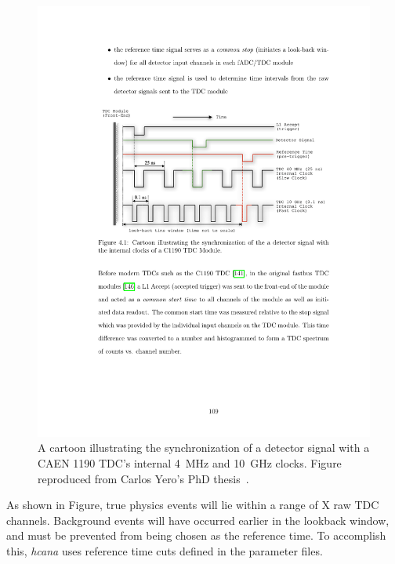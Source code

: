 \begin{figure}[!h]
    \centering
    \includegraphics[width=1.0\textwidth]{chap4/yero_reftime.pdf}
    \caption{
            A cartoon illustrating the synchronization of a detector signal
            with a CAEN 1190 TDC's internal \SI{4}{\mega\hertz} and
            \SI{10}{\giga\hertz} clocks. Figure reproduced from Carlos Yero's
            PhD thesis~\cite{Yero_2020}.
            }
    \label{fig:reference_time_cartoon}
\end{figure}


As shown in Figure,
true physics events will lie within a range of X raw TDC channels.
Background events will have occurred earlier in the lookback window, and must
be prevented from being chosen as the reference time.
To accomplish this, \textit{hcana} uses reference time cuts defined in
the parameter files.



